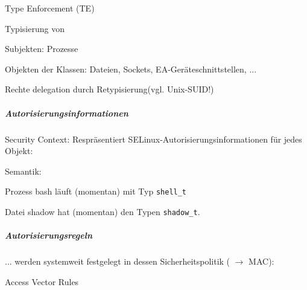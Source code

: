 \documentclass[a4paper]{article}
\begin{document}
\begin{multicols}{3}
    \begin{itemize*}
        \item
        Type Enforcement (TE)
        \item
        Typisierung von
        \begin{itemize*}
            \item Subjekten: Prozesse
            \item Objekten der Klassen: Dateien, Sockets, EA-Geräteschnittstellen, ...
        \end{itemize*}
        \item
        Rechte delegation durch Retypisierung(vgl. Unix-SUID!)
        \item
    \end{itemize*}


    \subparagraph{Autorisierungsinformationen}

    Security Context: Respräsentiert SELinux-Autorisierungsinformationen für
    jedes Objekt:


    \begin{itemize*}
        \item
        Semantik:
        \begin{itemize*}
            \item Prozess bash läuft (momentan) mit Typ \texttt{shell\_t}
            \item Datei shadow hat (momentan) den Typen \texttt{shadow\_t}.
        \end{itemize*}
    \end{itemize*}


    \subparagraph{Autorisierungsregeln}

    ... werden systemweit festgelegt in dessen Sicherheitspolitik
    ( $\rightarrow$ MAC):

    Access Vector Rules


\end{multicols}
\end{document}
